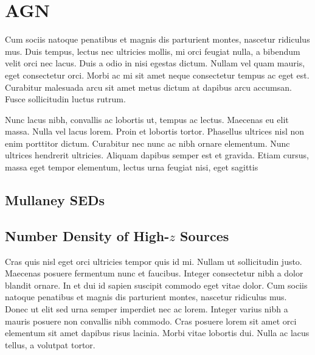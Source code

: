 \documentclass[usenatbib]{mn2e}
\begin{document}
\section{AGN}
Cum sociis natoque penatibus et magnis dis parturient montes, nascetur ridiculus mus. Duis tempus, lectus nec ultricies mollis, mi orci feugiat nulla, a bibendum velit orci nec lacus. Duis a odio in nisi egestas dictum. Nullam vel quam mauris, eget consectetur orci. Morbi ac mi sit amet neque consectetur tempus ac eget est. Curabitur malesuada arcu sit amet metus dictum at dapibus arcu accumsan. Fusce sollicitudin luctus rutrum.

Nunc lacus nibh, convallis ac lobortis ut, tempus ac lectus. Maecenas eu elit massa. Nulla vel lacus lorem. Proin et lobortis tortor. Phasellus ultrices nisl non enim porttitor dictum. Curabitur nec nunc ac nibh ornare elementum. Nunc ultrices hendrerit ultricies. Aliquam dapibus semper est et gravida. Etiam cursus, massa eget tempor elementum, lectus urna feugiat nisi, eget sagittis
\subsection{Mullaney SEDs}

\subsection{Number Density of High-$z$ Sources}
Cras quis nisl eget orci ultricies tempor quis id mi. Nullam ut sollicitudin justo. Maecenas posuere fermentum nunc et faucibus. Integer consectetur nibh a dolor blandit ornare. In et dui id sapien suscipit commodo eget vitae dolor. Cum sociis natoque penatibus et magnis dis parturient montes, nascetur ridiculus mus. Donec ut elit sed urna semper imperdiet nec ac lorem. Integer varius nibh a mauris posuere non convallis nibh commodo. Cras posuere lorem sit amet orci elementum sit amet dapibus risus lacinia. Morbi vitae lobortis dui. Nulla ac lacus tellus, a volutpat tortor.



\end{document}
